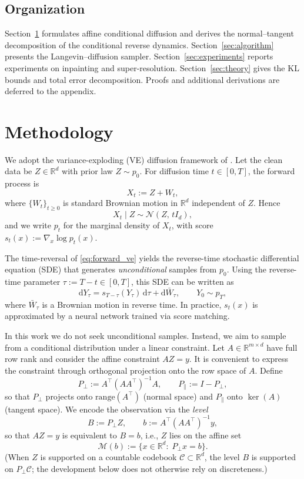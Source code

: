 \documentclass[twoside,11pt]{article}
\newcommand{\R}{\mathbb{R}}
\newcommand{\Nc}{\mathcal{N}}
\newcommand{\Cc}{\mathcal{C}}
\newcommand{\dd}{\mathrm{d}}
\newcommand{\Mc}{\mathcal{M}}
\numberwithin{equation}{section}
\begin{document}
\subsection{Organization}

Section~\ref{sec:methodology} formulates affine conditional diffusion and
derives the normal--tangent decomposition of the conditional reverse dynamics.
Section~\ref{sec:algorithm} presents the Langevin--diffusion sampler.
Section~\ref{sec:experiments} reports experiments on inpainting and
super-resolution. Section~\ref{sec:theory} gives the KL bounds and total error
decomposition. Proofs and additional derivations are deferred to the appendix.
\section{Methodology}\label{sec:methodology}


We adopt the variance-exploding (VE)  diffusion framework of \cite{song2021scorebased}. Let the clean data be
\(Z\in\R^d\) with prior law \(Z\sim p_0\). For diffusion time \(t\in[0,T]\), the forward process is
\begin{equation}\label{eq:forward_ve}
X_t := Z + W_t,
\end{equation}
where \(\{W_t\}_{t\ge 0}\) is standard Brownian motion in \(\R^d\) independent of \(Z\). Hence
\begin{equation}\label{eq:forward_kernel}
X_t \mid Z \sim \Nc(Z,\,tI_d),
\end{equation}
and we write \(p_t\) for the marginal density of \(X_t\), with score \(s_t(x):=\nabla_x\log p_t(x)\).


The time-reversal of \eqref{eq:forward_ve} yields the reverse-time stochastic
differential equation (SDE) that generates \emph{unconditional} samples
from \(p_0\). Using the reverse-time parameter \(\tau:=T-t\in[0,T]\), this SDE can be written as
\begin{equation}\label{eq:reverse_ve}
\dd Y_\tau
=
s_{T-\tau}(Y_\tau)\,\dd\tau
+
\dd \bar W_\tau,
\qquad
Y_0\sim p_T,
\end{equation}
where \(\bar W_\tau\) is a Brownian motion in reverse time. In practice, \(s_t(x)\) is approximated by a
neural network trained via score matching.

In this work we do not seek unconditional samples. Instead, we aim to sample from a conditional distribution under
a linear constraint. Let \(A\in\R^{m\times d}\) have full row rank and consider the affine constraint \(AZ=y\).
It is convenient to express the constraint through orthogonal projection onto the row space of \(A\). Define
\[
P_{\perp}:=A^\top(AA^\top)^{-1}A,
\qquad
P_{\parallel}:=I-P_{\perp},
\]
so that \(P_\perp\) projects onto \(\mathrm{range}(A^\top)\) (normal space) and \(P_\parallel\) onto \(\ker(A)\)
(tangent space). We encode the observation via the \emph{level}
\[
B := P_{\perp}Z,
\qquad
b := A^\top(AA^\top)^{-1}y,
\]
so that \(AZ=y\) is equivalent to \(B=b\), i.e., \(Z\) lies on the affine set
\[
\Mc(b):=\{x\in\R^d:\;P_\perp x=b\}.
\]
(When \(Z\) is supported on a countable codebook \(\Cc\subset\R^d\), the level \(B\) is supported on
\(P_\perp\Cc\); the development below does not otherwise rely on discreteness.)
\end{document}

